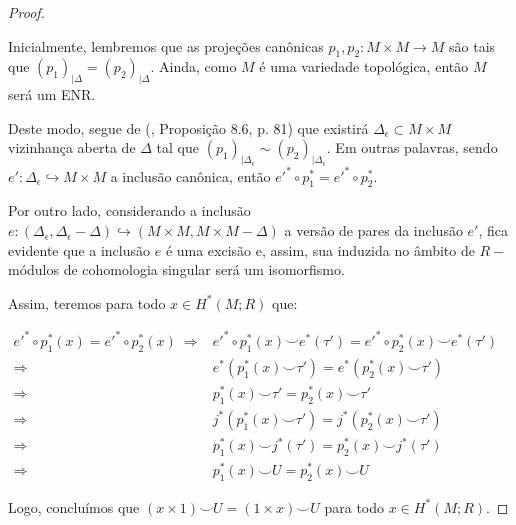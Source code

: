 \documentclass[12pt,oneside]{book} %
\newcommand{\ccup}{\smile}
\begin{document}
\begin{proof}
	
	\
	
	\par Inicialmente, lembremos que as projeções canônicas $p_{1},p_{2}:M\times M\to M$ são tais que $(p_{1})_{|\Delta}=(p_{2})_{|\Delta}$. Ainda, como $M$ é uma variedade topológica, então $M$ será um ENR.
	
	\par Deste modo, segue de (\cite{dold}, Proposição 8.6, p. 81) que existirá $\Delta_{\epsilon}\subset M\times M$ vizinhança aberta de $\Delta$ tal que $(p_{1})_{|\Delta_{\epsilon}}\sim (p_{2})_{|\Delta_{\epsilon}}$. Em outras palavras, sendo $e':\Delta_{\epsilon}\hookrightarrow M\times M$ a inclusão canônica, então $e'^{*}\circ p_{1}^{*}=e'^{*}\circ p_{2}^{*}$.
	
	\par Por outro lado, considerando a inclusão $e:(\Delta_{\epsilon},\Delta_{\epsilon}-\Delta)\hookrightarrow (M\times M,M\times M-\Delta)$ a versão de pares da inclusão $e'$, fica evidente que a inclusão $e$ é uma excisão e, assim, sua induzida no âmbito de $R-$módulos de cohomologia singular será um isomorfismo.
	
	\par Assim, teremos para todo $x\in H^{*}(M;R)$ que:
	
	$ \begin{array}{rl}
		e'^{*}\circ p_{1}^{*}(x)=e'^{*}\circ p_{2}^{*}(x) \ \Longrightarrow & e'^{*}\circ p_{1}^{*}(x)\ccup e^{*}(\tau')=e'^{*}\circ p_{2}^{*}(x)\ccup e^{*}(\tau') \\
		\Longrightarrow & e^{*}(p_{1}^{*}(x)\ccup \tau')=e^{*}(p_{2}^{*}(x)\ccup \tau') \\
		\Longrightarrow & p_{1}^{*}(x)\ccup \tau'=p_{2}^{*}(x)\ccup \tau' \\
		\Longrightarrow & j^{*}(p_{1}^{*}(x)\ccup \tau')=j^{*}(p_{2}^{*}(x)\ccup \tau') \\
		\Longrightarrow & p_{1}^{*}(x)\ccup j^{*}(\tau')=p_{2}^{*}(x)\ccup j^{*}(\tau') \\
		\Longrightarrow & p_{1}^{*}(x)\ccup U=p_{2}^{*}(x)\ccup U
	\end{array} $
	
	\par Logo, concluímos que $(x\times 1)\ccup U=(1\times x)\ccup U$ para todo $x\in H^{*}(M;R)$.
	
\end{proof}
\end{document}
